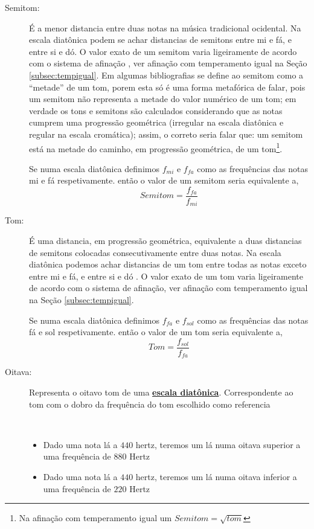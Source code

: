 \begin{description}
\item [Semitom:] \label{sec:pos:Semitom}
É a menor distancia entre duas notas na música tradicional ocidental.
Na escala diatônica podem se achar distancias de semitons entre mi e fá, e entre si e dó.
O valor exato de um semitom varia ligeiramente de acordo com o sistema de afinação \cite[pp. 30]{cardoso1973curso}\cite[pp. 762]{apel1969harvard}, ver afinação com temperamento igual na Seção \ref{subsec:tempigual}. 
Em algumas bibliografias se define ao semitom como a ``metade'' de um tom, 
porem esta só é uma forma metafórica de falar, 
pois um semitom não representa a metade do valor numérico de um tom;
em verdade os tons e semitons são calculados considerando que as notas cumprem uma progressão geométrica
(irregular na escala diatônica e regular na escala cromática);
assim, o correto seria falar que: um semitom está na metade do caminho, em progressão geométrica, de um tom\footnote{Na 
afinação com temperamento igual um $Semitom=\sqrt{tom}$}.
\begin{example}
Se numa escala diatônica definimos $f_{mi}$ e $f_{fa}$ como as frequências das notas mi e fá respetivamente.
então o valor de um semitom seria equivalente a,
\begin{equation*}
Semitom=\frac{f_{fa}}{f_{mi}}
\end{equation*}
\end{example}

\item [Tom:] \label{sec:pos:TomDist}
É uma distancia, em progressão geométrica, equivalente a duas distancias de semitons colocadas consecutivamente entre duas notas.
Na escala diatônica podemos achar distancias de um tom entre todas as notas exceto entre mi e fá, e entre si e dó \cite[pp. 30]{cardoso1973curso}\cite[pp. 762]{apel1969harvard}.
O valor exato de um tom varia ligeiramente de acordo com o sistema de afinação, ver afinação com temperamento igual na Seção \ref{subsec:tempigual}. 
\begin{example}
Se numa escala diatônica definimos $f_{fa}$ e $f_{sol}$ como as frequências das notas fá e sol respetivamente.
então o valor de um tom seria equivalente a,
\begin{equation*}
Tom=\frac{f_{sol}}{f_{fa}}
\end{equation*}
\end{example}

\item [Oitava:] \label{sec:pos:Oitava}
Representa o oitavo tom de uma \hyperref[sec:pos:Diatonica]{\textbf{escala diatônica}}. 
Correspondente  ao tom com o dobro da frequência do tom escolhido como referencia \cite[pp. 589]{apel1969harvard}
\begin{example}~
\begin{itemize}
\item Dado uma nota lá a $440$ hertz, teremos um lá numa oitava superior a uma frequência de $880$ Hertz  
\item Dado uma nota lá a $440$ hertz, teremos um lá numa oitava inferior a uma frequência de $220$ Hertz  
\end{itemize}
\end{example}



\end{description}
